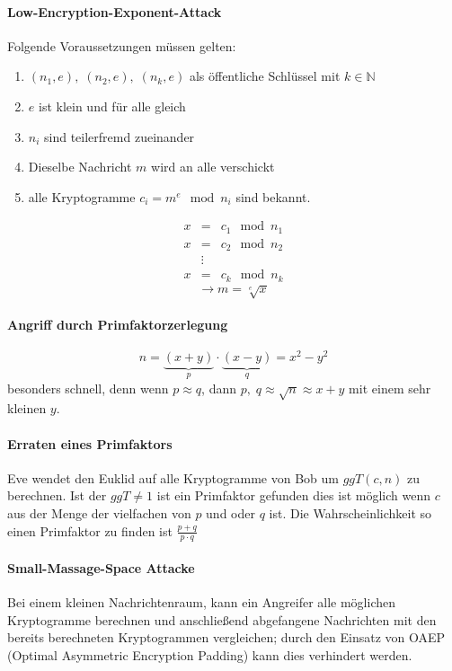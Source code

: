 \documentclass[8pt,a4paper,landscape]{article}
\begin{document}
\begin{multicols}{4}
\paragraph{Low-Encryption-Exponent-Attack}
Folgende Voraussetzungen müssen gelten: \begin{enumerate}[itemsep=1pt] 
\item $(n_1, e), \; (n_2, e), \; (n_k, e)$ als öffentliche Schlüssel mit $k \in \mathbb{N}$
\item $e$ ist klein und für alle gleich
\item $n_i$ sind teilerfremd zueinander
\item Dieselbe Nachricht $m$ wird an alle verschickt
\item alle Kryptogramme $c_i = m^e \mod n_i$ sind bekannt.
\end{enumerate}
\begin{eqnarray}
x &=& c_{1} \mod n_{1} \nonumber\\[-3pt]
x &=& c_{2} \mod n_{2} \nonumber\\[-3pt]
&\vdots & \nonumber \\[-3pt]
x &=& c_{k} \mod n_{k} \nonumber
\end{eqnarray} \[\boxed{\rightarrow m = \sqrt[e]{x}}\]

\paragraph{Angriff durch Primfaktorzerlegung} 
\[ n = \underbrace{(x+y)}_{p} \cdot \underbrace{(x-y)}_{q} = x^2 -y^2\]
besonders schnell, denn wenn $ p \approx q$, dann
$ p, \; q \approx \sqrt{n} \approx x + y$
mit einem sehr kleinen $y$. 

\paragraph{Erraten eines Primfaktors} Eve wendet den Euklid auf alle Kryptogramme von Bob um $ggT(c,n)$ zu berechnen. Ist der $ggT \not= 1$ ist ein Primfaktor gefunden dies ist möglich wenn $c$ aus der Menge der vielfachen von $p$ und oder $q$ ist. Die Wahrscheinlichkeit so einen Primfaktor zu finden ist $\frac{p + q}{p \cdot q}$

\paragraph{Small-Massage-Space Attacke} Bei einem kleinen Nachrichtenraum, kann ein Angreifer alle möglichen Kryptogramme berechnen und anschließend abgefangene Nachrichten mit den bereits berechneten Kryptogrammen vergleichen; durch den Einsatz von OAEP (Optimal Asymmetric Encryption Padding) kann dies verhindert werden. 


\end{multicols}
\end{document}
